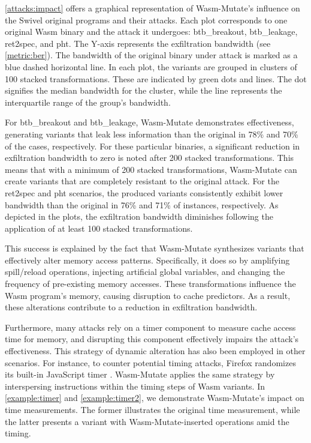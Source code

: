 \documentclass[sigplan,screen]{acmart}
\newcommand{\tool}{{\sc Wasm-Mutate}\xspace}
\newcommand{\wasm}{Wasm\xspace}
\begin{document}
\autoref{attacks:impact} offers a graphical representation of \tool's influence on the Swivel original programs and their attacks. 
Each plot corresponds to one original \wasm binary and the attack it undergoes: btb\_breakout, btb\_leakage, ret2spec, and pht.
The Y-axis represents the exfiltration bandwidth (see \autoref{metric:ber}). 
The bandwidth of the original binary under attack is marked as a blue dashed horizontal line.
In each plot, the variants are grouped in clusters of 100 stacked transformations. 
These are indicated by green dots and lines. 
The dot signifies the median bandwidth for the cluster, while the line represents the interquartile range of the group's bandwidth.



For btb\_breakout and btb\_leakage, \tool demonstrates effectiveness, generating variants that leak less information than the original in 78\% and 70\% of the cases, respectively.
For these particular binaries, a significant reduction in exfiltration bandwidth to zero is noted after 200 stacked transformations.
This means that with a minimum of 200 stacked transformations, \tool can create variants that are completely resistant to the original attack.
For the ret2spec and pht scenarios, the produced variants consistently exhibit lower bandwidth than the original in 76\% and 71\% of instances, respectively.
As depicted in the plots, the exfiltration bandwidth diminishes following the application of at least  100 stacked transformations.

This success is explained by the fact that \tool synthesizes variants that effectively alter memory access patterns. 
Specifically, it does so by amplifying spill/reload operations, injecting artificial global variables, and changing the frequency of pre-existing memory accesses. 
These transformations influence the \wasm program's memory, causing disruption to cache predictors. 
As a result, these alterations contribute to a reduction in exfiltration bandwidth.

Furthermore, many attacks rely on a timer component to measure cache access time for memory, and disrupting this component  effectively impairs the attack's effectiveness. 
This strategy of dynamic alteration has also been  employed in other scenarios. 
For instance, to counter potential timing attacks, Firefox randomizes its built-in JavaScript timer \cite{10.1007/978-3-319-70972-7_13}. \tool applies the same strategy by interspersing instructions within the timing steps of \wasm variants. 
In \autoref{example:timer} and \autoref{example:timer2}, we demonstrate \tool's impact on time measurements. 
The former illustrates the original time measurement, while the latter presents a variant with \tool-inserted operations amid the timing.
\end{document}
